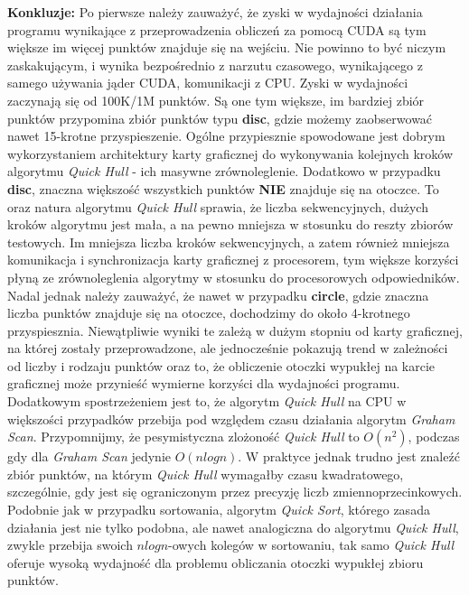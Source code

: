 \documentclass[11pt]{article}
\begin{document}
    \textbf{Konkluzje:} Po pierwsze należy zauważyć, że zyski w wydajności działania programu wynikające z przeprowadzenia obliczeń za pomocą CUDA są tym większe im więcej punktów znajduje się na wejściu. Nie powinno to być niczym zaskakującym, i wynika bezpośrednio z narzutu czasowego, wynikającego z samego używania jąder CUDA, komunikacji z CPU. Zyski w wydajności zaczynają się od 100K/1M punktów. Są one tym większe, im bardziej zbiór punktów przypomina zbiór punktów typu \textbf{disc}, gdzie możemy zaobserwować nawet 15-krotne przyspieszenie. Ogólne przypiesznie spowodowane jest dobrym wykorzystaniem architektury karty graficznej do wykonywania kolejnych kroków algorytmu \textit{Quick Hull} - ich masywne zrównoleglenie. Dodatkowo w przypadku \textbf{disc}, znaczna większość wszystkich punktów \textbf{NIE} znajduje się na otoczce. To oraz natura algorytmu \textit{Quick Hull} sprawia, że liczba sekwencyjnych, dużych kroków algorytmu jest mała, a na pewno mniejsza w stosunku do reszty zbiorów testowych. Im mniejsza liczba kroków sekwencyjnych, a zatem również mniejsza komunikacja i synchronizacja karty graficznej z procesorem, tym większe korzyści płyną ze zrównoleglenia algorytmy w stosunku do procesorowych odpowiedników. Nadal jednak należy zauważyć, że nawet w przypadku \textbf{circle}, gdzie znaczna liczba punktów znajduje się na otoczce, dochodzimy do około 4-krotnego przyspiesznia. Niewątpliwie wyniki te zależą w dużym stopniu od karty graficznej, na której zostały przeprowadzone, ale jednocześnie pokazują trend w zależności od liczby i rodzaju punktów oraz to, że obliczenie otoczki wypukłej na karcie graficznej może przynieść wymierne korzyści dla wydajności programu. \\
    
    Dodatkowym spostrzeżeniem jest to, że algorytm \textit{Quick Hull} na CPU w większości przypadków przebija pod względem czasu działania algorytm \textit{Graham Scan}. Przypomnijmy, że pesymistyczna zlożoność \textit{Quick Hull} to $O(n^2)$, podczas gdy dla \textit{Graham Scan} jedynie $O(nlogn)$. W praktyce jednak trudno jest znaleźć zbiór punktów, na którym \textit{Quick Hull} wymagałby czasu kwadratowego, szczególnie, gdy jest się ograniczonym przez precyzję liczb zmiennoprzecinkowych. Podobnie jak w przypadku sortowania, algorytm \textit{Quick Sort}, którego zasada działania jest nie tylko podobna, ale nawet analogiczna do algorytmu \textit{Quick Hull}, zwykle przebija swoich $nlogn$-owych kolegów w sortowaniu, tak samo \textit{Quick Hull} oferuje wysoką wydajność dla problemu obliczania otoczki wypukłej zbioru punktów. 
            
\end{document}
